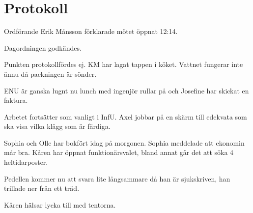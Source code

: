 \documentclass[10pt]{article}
\def\mo{Erik Månsson}
\begin{document}
\section*{Protokoll}
\begin{paragrafer}
Ordförande {\mo} förklarade mötet öppnat 12:14.

{\valavmo}

{\valavms}

{\valavj}

{\tosg}

{\ingaadj}

Dagordningen godkändes.


\begin{fyllnadsval} %
\end{fyllnadsval}

\begin{paragrafer}
Punkten protokollfördes ej.
KM har lagat tappen i köket. Vattnet fungerar inte ännu då packningen är sönder.

ENU är ganska lugnt nu lunch med ingenjör rullar på och Josefine har skickat en faktura.

Arbetet fortsätter som vanligt i InfU. Axel jobbar på en skärm till edekvata som ska visa vilka klägg som är färdiga.

Sophia och Olle har bokfört idag på morgonen.
Sophia meddelade att ekonomin mår bra.
Kåren har öppnat funktionärsvalet, bland annat går det att söka 4 heltidarposter.

Pedellen kommer nu att svara lite långsammare då han är sjukskriven, han trillade ner från ett träd.

Kåren hälsar lycka till med tentorna.
\end{paragrafer}


\end{paragrafer}
\end{document}
